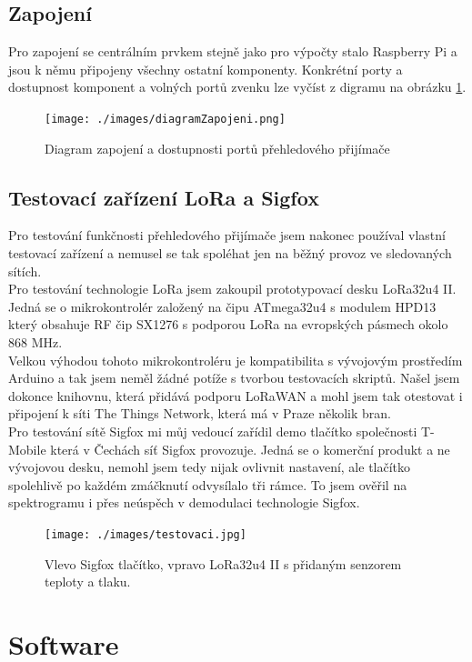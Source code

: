 \documentclass{ctuthesis}
\begin{document}
\section{Zapojení}
Pro zapojení se centrálním prvkem stejně jako pro výpočty stalo Raspberry Pi a jsou k němu připojeny všechny ostatní komponenty. Konkrétní porty a dostupnost komponent a volných portů zvenku lze vyčíst z digramu na obrázku \ref{zapojení}.
\begin{figure}
\caption{Diagram zapojení a dostupnosti portů přehledového přijímače}
\texttt{[image: ./images/diagramZapojeni.png]}
\label{zapojení}
\end{figure}
\section{Testovací zařízení LoRa a Sigfox}
Pro testování funkčnosti přehledového přijímače jsem nakonec používal vlastní testovací zařízení a nemusel se tak spoléhat jen na běžný provoz ve sledovaných sítích.\\
Pro testování technologie LoRa jsem zakoupil prototypovací desku LoRa32u4 II. Jedná se o mikrokontrolér založený na čipu ATmega32u4 s modulem HPD13 který obsahuje RF čip SX1276 s podporou LoRa na evropských pásmech okolo 868 MHz. \\
Velkou výhodou tohoto mikrokontroléru je kompatibilita s vývojovým prostředím Arduino a tak jsem neměl žádné potíže s tvorbou testovacích skriptů. Našel jsem dokonce knihovnu, která přidává podporu LoRaWAN a mohl jsem tak otestovat i připojení k síti The Things Network, která má v Praze několik bran.
\\Pro testování sítě Sigfox mi můj vedoucí zařídil demo tlačítko společnosti T-Mobile která v Čechách síť Sigfox provozuje. Jedná se o komerční produkt a ne vývojovou desku, nemohl jsem tedy nijak ovlivnit nastavení, ale tlačítko spolehlivě po každém zmáčknutí odvysílalo tři rámce. To jsem ověřil na spektrogramu i přes neúspěch v demodulaci technologie Sigfox.

\begin{figure}
	\caption{Vlevo Sigfox tlačítko, vpravo LoRa32u4 II s přidaným senzorem teploty a tlaku.}
	\texttt{[image: ./images/testovaci.jpg]}
	\label{testovací}
\end{figure}

\chapter{Software}
\end{document}
